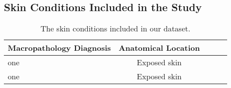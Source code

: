 \begin{appendices}
\blindtext  


\section{Skin Conditions Included in the Study}
\blindtext  

\begin{table}[h!]
\centering
\caption{The skin conditions included in our dataset.}
\label{tabl:diseases}
	\begin{tabular}{l c c c c} 
 		\toprule %
 		 Macropathology Diagnosis & Anatomical Location \\ [0.5ex] 
 		\midrule %
 		one & Exposed skin \\
 		one & Exposed skin \\
 		\bottomrule %
	\end{tabular}
\end{table} 

\noindent \blindtext  
 


\end{appendices}